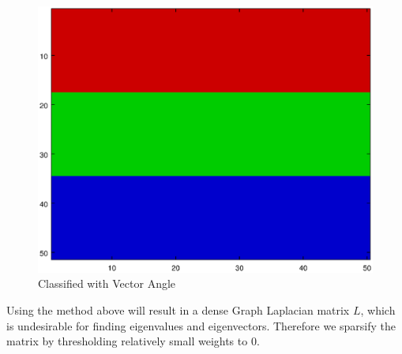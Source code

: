\documentclass[12pt]{article}
\newcommand{\norm}[1]{\left\lVert#1\right\rVert}
\begin{document}
\begin{figure}
  \centering
  \includegraphics[width=.45\linewidth]{./Images/simpleStripes/classify.eps}
  \caption{Classified with Vector Angle}
  \label{fig:StripeVectorAngle}
\end{figure}

Using the method above will result in a dense Graph Laplacian matrix $L$, which is undesirable for finding eigenvalues and eigenvectors. Therefore we sparsify the matrix by thresholding relatively small weights to 0.


\end{document}

